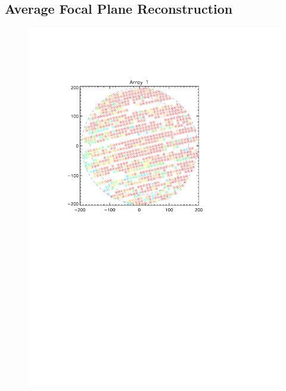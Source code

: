 \subsection{Average Focal Plane Reconstruction}
\label{avg_kidpar}

\begin{figure}[p]
\begin{center}
\includegraphics[scale=0.1]{Figures/A1_fwhm_color_count.pdf}

\end{center}
\end{figure}
